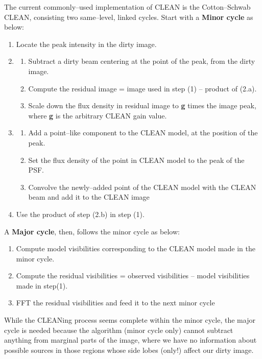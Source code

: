 \documentclass[paper=a4, fontsize=11pt]{scrartcl} %
\numberwithin{equation}{section} %
\numberwithin{figure}{section} %
\numberwithin{table}{section} %
\begin{document}
The current commonly--used implementation of CLEAN is the Cotton--Schwab CLEAN, consisting two same--level, linked cycles.
Start with a {\bf Minor cycle} as below:
\begin{enumerate}
\item Locate the peak intensity in the dirty image.
\item\begin{enumerate}
    \item Subtract a dirty beam centering at the point of the peak, from the dirty image.
    \item Compute the residual image = image used in step (1) -- product of (2.a).
    \item Scale down the flux density in residual image to {\bf g} times the image peak, where {\bf g} is the arbitrary CLEAN gain value.
    \end{enumerate}
\item\begin{enumerate}
    \item Add a point--like component to the CLEAN model, at the position of the peak.
    \item Set the flux density of the point in CLEAN model to the peak of the PSF.
    \item Convolve the newly--added point of the CLEAN model with the CLEAN beam and add it to the CLEAN image
    \end{enumerate}
\item Use the product of step (2.b) in step (1). 
\end{enumerate}
A {\bf Major cycle}, then, follows the minor cycle as below:
\begin{enumerate}
\item Compute model visibilities corresponding to the CLEAN model made in the minor cycle.
\item Compute the residual visibilities = observed visibilities -- model visibilities made in step(1).
\item FFT the residual visibilities and feed it to the next minor cycle 
\end{enumerate}

While the CLEANing process seems complete within the minor cycle, the major cycle is needed because the algorithm (minor cycle only) cannot subtract anything from marginal parts of the image, where we have no information about possible sources in those regions whose side lobes (only!) affect our dirty image.
\end{document}
